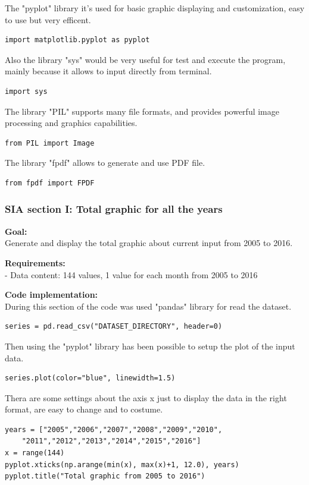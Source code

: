 The "pyplot" library it's used for basic graphic displaying and customization, easy to use but very efficent.
\begin{lstlisting}
import matplotlib.pyplot as pyplot
\end{lstlisting}

Also the library "sys" would be very useful for test and execute the program, mainly because it allows to input directly from terminal.
\begin{lstlisting}
import sys
\end{lstlisting}

The library "PIL" supports many file formats, and provides powerful image processing and graphics capabilities.
\begin{lstlisting}
from PIL import Image
\end{lstlisting}

The library "fpdf" allows to generate and use PDF file.
\begin{lstlisting}
from fpdf import FPDF
\end{lstlisting}
\newpage
\subsubsection{SIA section I: Total graphic for all the years}
\textbf{Goal:}\\
Generate and display the total graphic about current input from 2005 to 2016.

\textbf{Requirements:}\\
- Data content: 144 values, 1 value for each month from 2005 to 2016

\textbf{Code implementation:}\\
During this section of the code was used "pandas" library for read the dataset.
\begin{lstlisting}
series = pd.read_csv("DATASET_DIRECTORY", header=0)
\end{lstlisting}

Then using the "pyplot" library has been possible to setup the plot of the input data.
\begin{lstlisting}
series.plot(color="blue", linewidth=1.5)
\end{lstlisting}


Thera are some settings about the axis x just to display the data in the right format, are easy to change and to costume.
\begin{lstlisting}
years = ["2005","2006","2007","2008","2009","2010",
	"2011","2012","2013","2014","2015","2016"]
x = range(144)
pyplot.xticks(np.arange(min(x), max(x)+1, 12.0), years)
pyplot.title("Total graphic from 2005 to 2016")
\end{lstlisting}

